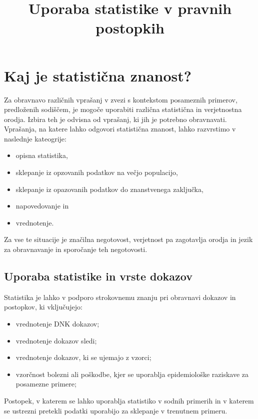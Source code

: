 \documentclass[a4paper,12pt]{article}
\begin{document}
\title{Uporaba statistike v pravnih postopkih}
\maketitle

\section{Kaj je statistična znanost?}
Za obravnavo različnih vprašanj v zvezi s kontekstom posameznih primerov, predloženih sodiščem, je mogoče uporabiti različna statistična in 
verjetnostna orodja. Izbira teh je odvisna od vprašanj, ki jih je potrebno obravnavati. Vprašanja, na katere lahko odgovori statistična 
znanost, lahko razvrstimo v naslednje kateogrije:

\begin{itemize}
   \item opisna statistika,
   \item sklepanje iz opzovanih podatkov na večjo populacijo,
   \item sklepanje iz opazovanih podatkov do znanstvenega zaključka,
   \item napovedovanje in
   \item vrednotenje.
\end{itemize}

Za vse te situacije je značilna negotovost, verjetnost pa zagotavlja orodja in jezik za obravnavanje in sporočanje teh negotovosti.

\subsection{Uporaba statistike in vrste dokazov}
Statistika je lahko v podporo strokovnemu znanju pri obravnavi dokazov in postopkov, ki vključujejo:
\begin{itemize}
   \item vrednotenje DNK dokazov;
   \item vrednotenje dokazov sledi;
   \item vrednotenje dokazov, ki se ujemajo z vzorci;
   \item vzorčnost bolezni ali poškodbe, kjer se uporablja epidemiološke raziskave za posamezne primere;
\end{itemize}

Postopek, v katerem se lahko uporablja statistiko v sodnih primerih in v katerem se ustrezni pretekli podatki uporabijo za 
sklepanje v trenutnem primeru.
\end{document}

